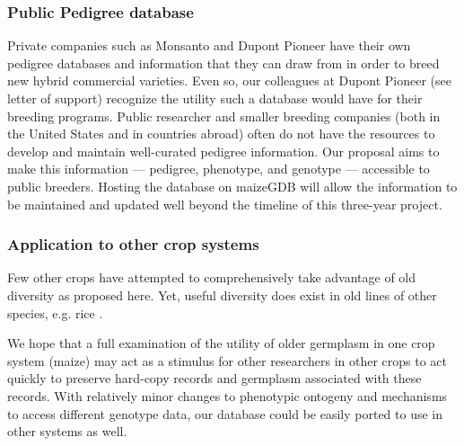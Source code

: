 \documentclass[12pt]{article}
\begin{document}
\subsubsection*{Public Pedigree database}
Private companies such as Monsanto and Dupont Pioneer have their own pedigree databases and information that they can draw from in order to breed new hybrid commercial varieties. 
Even so, our colleagues at Dupont Pioneer (see letter of support) recognize the utility such a database would have for their breeding programs.
Public researcher and smaller breeding companies  (both in the United States and in countries abroad) often do not have the resources to develop and maintain well-curated pedigree information. 
Our proposal aims to make this information --- pedigree, phenotype, and genotype --- accessible to public breeders.
Hosting the database on maizeGDB will allow the information to be maintained and updated well beyond the timeline of this three-year project.

\subsubsection*{Application to other crop systems}
Few other crops have attempted to comprehensively take advantage of old diversity as proposed here.  
Yet, useful diversity does exist in old lines of other species, e.g. rice \citep{gamuyao2012protein}. 

We hope that a full examination of the utility of older germplasm in one crop system (maize) may act as a stimulus for other researchers in other crops to act quickly to preserve hard-copy records and germplasm associated with these records. 
With relatively minor changes to phenotypic ontogeny and mechanisms to access different genotype data, our database could be easily ported to use in other systems as well. 

\newpage

\end{document}
